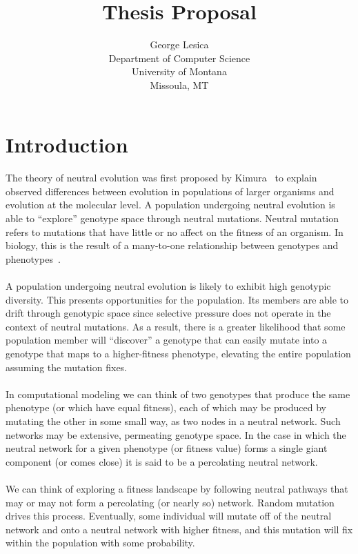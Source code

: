 \documentclass[12pt,letterpaper,titlepage,draft]{article}
\title{Thesis Proposal}
\author{George Lesica\\
Department of Computer Science\\
University of Montana\\
Missoula, MT}
\begin{document}
\maketitle

\section{Introduction}

\paragraph{}
The theory of neutral evolution was first proposed by Kimura~\cite{Kimura1984}
to explain observed differences between evolution in populations of larger
organisms and evolution at the molecular level. A population undergoing
neutral evolution is able to ``explore'' genotype space through neutral
mutations. Neutral mutation refers to mutations that have little or no affect
on the fitness of an organism. In biology, this is the result of a many-to-one
relationship between genotypes and phenotypes~\cite{Newman1998}.

\paragraph{}
A population undergoing neutral evolution is likely to exhibit high genotypic
diversity. This presents opportunities for the population. Its members are able
to drift through genotypic space since selective pressure does not operate in
the context of neutral mutations. As a result, there is a greater likelihood
that some population member will ``discover'' a genotype that can easily mutate
into a genotype that maps to a higher-fitness phenotype, elevating the entire
population assuming the mutation fixes.

\paragraph{}
In computational modeling we can think of two genotypes that produce the same
phenotype (or which have equal fitness), each of which may be produced by
mutating the other in some small way, as two nodes in a neutral network. Such
networks may be extensive, permeating genotype space. In the case in which the
neutral network for a given phenotype (or fitness value) forms a single giant
component (or comes close) it is said to be a percolating neutral network.

\paragraph{}
We can think of exploring a fitness landscape by following neutral pathways
that may or may not form a percolating (or nearly so) network. Random mutation
drives this process.  Eventually, some individual will mutate off of the
neutral network and onto a neutral network with higher fitness, and this
mutation will fix within the population with some probability.
\end{document}
